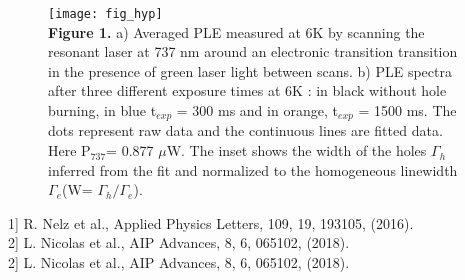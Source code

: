 \documentclass[a4paper,11pt]{article}
\begin{document}



\hspace{10pt}
\begin{figure}[h!]\centering
\texttt{[image: fig\_hyp]}\\
\noindent\textbf{Figure 1.} a) Averaged PLE measured at 6K by scanning the resonant laser at 737 nm around an electronic transition transition in the presence of green laser light between scans. b) PLE spectra after three different exposure times at 6K : in black without hole burning, in blue t$_{exp}$ = 300 ms and in orange, t$_{exp}$ = 1500 ms. The dots represent raw data and the continuous lines are fitted data. Here P$_{737}$= 0.877 $\mu$W. The inset shows the width of the holes $\Gamma_h$ inferred from the fit and normalized to the homogeneous linewidth $\Gamma_e$(W= $\Gamma_h/\Gamma_e$).
\end{figure}

%

\hspace{10pt}

\noindent{[}1{]} R. Nelz et al., Applied Physics Letters, 109, 19, 193105, (2016).\\
\noindent{[}2{]} L. Nicolas et al., AIP Advances, 8, 6, 065102, (2018).\\
\noindent{[}2{]} L. Nicolas et al., AIP Advances, 8, 6, 065102, (2018).\\
\end{document}
